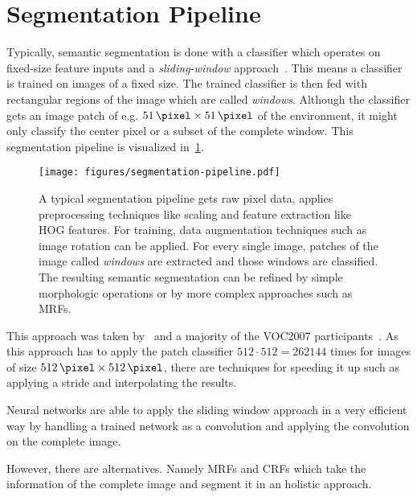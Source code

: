
\section{Segmentation Pipeline}

Typically, semantic segmentation is done with a classifier which operates on
fixed-size feature inputs and a \textit{sliding-window}
approach~\cite{1467360,5490399,schroff2008object}. This means a classifier is
trained on images of a fixed size. The trained classifier is then fed with
rectangular regions of the image which are called \textit{windows}. Although
the classifier gets an image patch of e.g. $\SI{51}{\pixel} \times
\SI{51}{\pixel}$ of the environment, it might only classify the center pixel or
a subset of the complete window. This
segmentation pipeline is visualized in~\cref{fig:segmentation-pipeline}.

\begin{figure}
    \centering
    \texttt{[image: figures/segmentation-pipeline.pdf]}
    \caption{A typical segmentation pipeline gets raw pixel data, applies
             preprocessing techniques like scaling and feature extraction like
             HOG features. For training, data augmentation techniques such as
             image rotation can be applied. For every single image, patches
             of the image called \textit{windows} are extracted and those
             windows are classified. The resulting semantic segmentation can
             be refined by simple morphologic operations or by more complex
             approaches such as \glspl{MRF}.}
    \label{fig:segmentation-pipeline}
\end{figure}

This approach was taken by~\cite{bittel2015pixel} and a majority of the VOC2007
participants~\cite{pascal-voc-2007}. As this approach has to apply the patch
classifier $512 \cdot 512 = \num{262144}$ times for images of size
$\SI{512}{\pixel} \times \SI{512}{\pixel}$, there are techniques for speeding
it up such as applying a stride and interpolating the results.

Neural networks are able to apply the sliding window approach in a very
efficient way by handling a trained network as a convolution and applying the
convolution on the complete image.

However, there are alternatives. Namely \glspl{MRF} and \glspl{CRF}
which take the information of the complete image and segment it in an holistic
approach.
